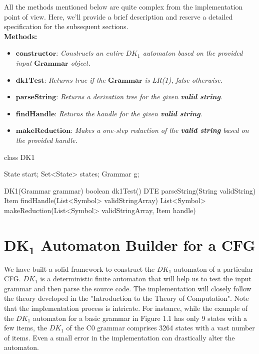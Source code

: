 All the methods mentioned below are quite complex from the implementation point of view. Here, we'll provide a brief description and reserve a detailed specification for the subsequent sections.\\

\textbf{Methods:}
\begin{itemize}
    \item \(\boldsymbol{constructor}\): \textit{Constructs an entire \(DK_{1}\) automaton based on the provided input \(\boldsymbol{Grammar}\) object.}
    \item \(\boldsymbol{dk1Test}\): \textit{Returns true if the \(\boldsymbol{Grammar}\) is LR(1), false otherwise.}
    \item \(\boldsymbol{parseString}\): \textit{Returns a derivation tree for the given \textbf{valid string}.}
    \item \(\boldsymbol{findHandle}\): \textit{Returns the handle for the given \textbf{valid string}.}
    \item \(\boldsymbol{makeReduction}\): \textit{Makes a one-step reduction of the \textbf{valid string} based on the provided handle.}
\end{itemize}

\begin{codeblock}[DK1 Class]
    class DK1 {
        State start;
        Set<State> states;
        Grammar g;

        DK1(Grammar grammar) {}
        boolean dk1Test() {}
        DTE parseString(String validString) {}
        Item findHandle(List<Symbol> validStringArray) {}
        List<Symbol> makeReduction(List<Symbol> validStringArray, Item handle) {}
    }
\end{codeblock}

\newpage


\section{\(\boldsymbol{DK_{1}}\) Automaton Builder for a CFG}\label{sec:DK1 Automaton Builder for a CFG}

We have built a solid framework to construct the \(DK_{1}\) automaton of a particular CFG. \(DK_{1}\) is a deterministic finite automaton that will help us to test the input grammar and then parse the source code. The implementation will closely follow the theory developed in the "Introduction to the Theory of Computation". Note that the implementation process is intricate. For instance, while the example of the \(DK_{1}\) automaton for a basic grammar in Figure 1.1 has only 9 states with a few items, the \(DK_{1}\) of the C0 grammar comprises 3264 states with a vast number of items. Even a small error in the implementation can drastically alter the automaton.

